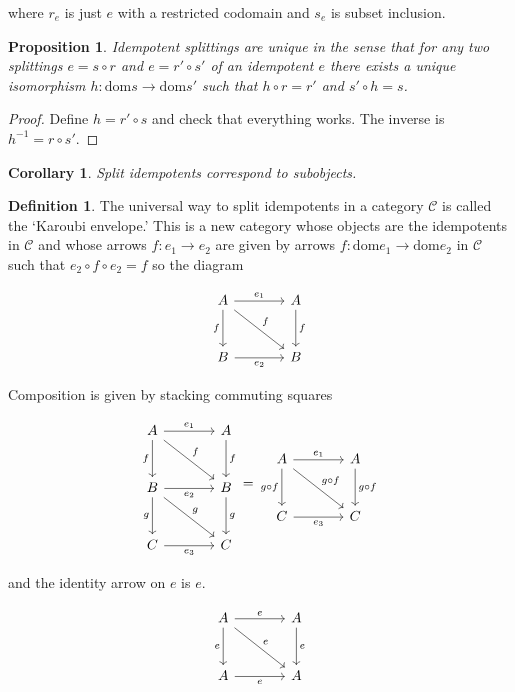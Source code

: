 \documentclass[11pt]{amsart}
\theoremstyle{plain}
\newtheorem{cor}[thm]{Corollary}
\newtheorem{prop}[thm]{Proposition}
\theoremstyle{definition}
\newtheorem{defn}[thm]{Definition}
\newcommand{\cC}{{\mathcal C}}
\newcommand{\dom}{\mathrm{dom}}
\newcommand{\noi}{{\noindent}}
\begin{document}
\noi where $r_e$ is just $e$ with a restricted codomain and $s_e$ is subset inclusion. 

\begin{prop}
Idempotent splittings are unique in the sense that for any two splittings $e = s \circ r$ and $e = r' \circ s'$ of an idempotent $e$ there exists a unique isomorphism $h : \dom s \to \dom s'$ such that $h \circ r = r'$ and $s' \circ h = s$. 
\end{prop}
\begin{proof}
Define $h = r' \circ s$ and check that everything works. The inverse is $h^{-1} = r \circ s'$. 
\end{proof}

\begin{cor}
Split idempotents correspond to subobjects. 
\end{cor}

\begin{defn}
The universal way to split idempotents in a category $\cC$ is called the `Karoubi envelope.' This is a new category whose objects are the idempotents in $\cC$ and whose arrows $f : e_1 \to e_2$ are given by arrows $f : \dom e_1 \to \dom e_2$ in $\cC$ such that $e_2 \circ f \circ e_2 = f$ so the diagram 

\[ \begin{tikzcd}[column sep = large, row sep = large]
  A \dar["f"'] \ar[dr, "f"] \rar["e_1"] & A \dar["f"] \\
  B \rar["e_2"'] & B 
\end{tikzcd}\]
\end{defn}

Composition is given by stacking commuting squares

\[ \begin{tikzcd}[column sep = large, row sep = large]
  A \dar["f"'] \ar[dr, "f"] \rar["e_1"] & A \dar["f"] \\
  B \rar["e_2"'] \dar["g"'] \ar[dr, "g"] & B \dar["g"] \\
  C \rar["e_3"'] & C
\end{tikzcd} = 
\begin{tikzcd}[column sep = large, row sep = large]
  A \dar["g \circ f"'] \ar[dr, "g \circ f"] \rar["e_1"] & A \dar["g \circ f"] \\
  C \rar["e_3"'] & C 
\end{tikzcd}\]

\noi and the identity arrow on $e$ is $e$. 

\[ \begin{tikzcd}[column sep = large, row sep = large]
  A \dar["e"'] \ar[dr, "e"] \rar["e"] & A \dar["e"] \\
  A \rar["e"'] & A 
\end{tikzcd}\]
\end{document}

